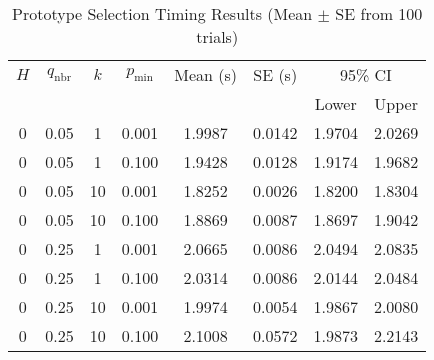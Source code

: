 \begin{table}[htbp]
\centering
\caption{Prototype Selection Timing Results (Mean $\pm$ SE from 100 trials)}
\label{tab:timing_results}
\begin{tabular}{cccccccc}
\toprule
$H$ & $q_{\text{nbr}}$ & $k$ & $p_{\text{min}}$ & Mean (s) & SE (s) & \multicolumn{2}{c}{95\% CI} \\
\cmidrule(lr){7-8}
 & & & & & & Lower & Upper \\
\midrule
0 & 0.05 & 1 & 0.001 & 1.9987 & 0.0142 & 1.9704 & 2.0269 \\
0 & 0.05 & 1 & 0.100 & 1.9428 & 0.0128 & 1.9174 & 1.9682 \\
0 & 0.05 & 10 & 0.001 & 1.8252 & 0.0026 & 1.8200 & 1.8304 \\
0 & 0.05 & 10 & 0.100 & 1.8869 & 0.0087 & 1.8697 & 1.9042 \\
0 & 0.25 & 1 & 0.001 & 2.0665 & 0.0086 & 2.0494 & 2.0835 \\
0 & 0.25 & 1 & 0.100 & 2.0314 & 0.0086 & 2.0144 & 2.0484 \\
0 & 0.25 & 10 & 0.001 & 1.9974 & 0.0054 & 1.9867 & 2.0080 \\
0 & 0.25 & 10 & 0.100 & 2.1008 & 0.0572 & 1.9873 & 2.2143 \\
\bottomrule
\end{tabular}
\end{table}